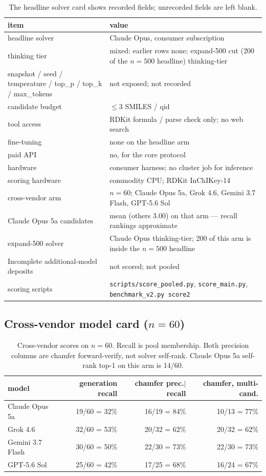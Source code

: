 \documentclass[11pt]{article}
\begin{document}
\begin{table}[h]
\caption{The headline solver card shows recorded fields; unrecorded
fields are left blank.}
\centering
\small
\begin{tabular}{@{}l>{\raggedright\arraybackslash}p{7.6cm}@{}}
\toprule
item & value \\
\midrule
headline solver & Claude Opus, consumer subscription \\
thinking tier & mixed: earlier rows none; expand-500 cut (200 of the $n{=}500$ headline) thinking-tier \\
snapshot / seed / temperature / top\_p / top\_k / max\_tokens &
  not exposed; not recorded \\
candidate budget & $\leq 3$ SMILES / qid \\
tool access & RDKit formula / parse check only; no web search \\
fine-tuning & none on the headline arm \\
paid API & no, for the core protocol \\
hardware & consumer harness; no cluster job for inference \\
scoring hardware & commodity CPU; RDKit InChIKey-14 \\
cross-vendor arm & $n{=}60$; Claude Opus 5a, Grok 4.6, Gemini 3.7 Flash, GPT-5.6 Sol \\
Claude Opus 5a candidates & 2.20 mean (others 3.00) on that arm --- recall rankings approximate \\
expand-500 solver & Claude Opus thinking-tier; 200 of this arm is inside the $n{=}500$ headline \\
Incomplete additional-model deposits & not scored; not pooled \\
scoring scripts & \texttt{scripts/score\_pooled.py}, \texttt{score\_main.py},
  \texttt{benchmark\_v2.py score2} \\
\bottomrule
\end{tabular}
\end{table}

\subsection{Cross-vendor model card ($n{=}60$)}

\begin{table}[h]
\caption{Cross-vendor scores on $n{=}60$.
Recall is pool membership.
Both precision columns are chamfer forward-verify, not solver self-rank.
Claude Opus 5a self-rank top-1 on this arm is 14/60.}
\centering
\small
\begin{tabular}{@{}lrrr@{}}
\toprule
model & generation recall & chamfer prec.$|$recall & chamfer, multi-cand. \\
\midrule
Claude Opus 5a & 19/60 = 32\% & 16/19 = 84\% & 10/13 = 77\% \\
Grok 4.6 & 32/60 = 53\% & 20/32 = 62\% & 20/32 = 62\% \\
Gemini 3.7 Flash & 30/60 = 50\% & 22/30 = 73\% & 22/30 = 73\% \\
GPT-5.6 Sol & 25/60 = 42\% & 17/25 = 68\% & 16/24 = 67\% \\
\bottomrule
\end{tabular}
\end{table}
\end{document}
